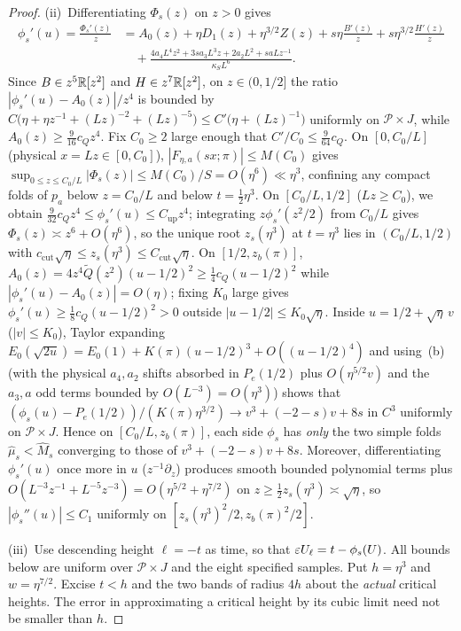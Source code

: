 \begin{proof}
(ii)~Differentiating $\Phi_s(z)$ on $z>0$ gives
\[
  \begin{aligned}
    \phi_s'(u) = \frac{\Phi_s'(z)}{z} &= A_0(z) + \eta D_1(z) + \eta^{3/2}Z(z) + s\eta\frac{B'(z)}{z} + s\eta^{3/2}\frac{H'(z)}{z}\\
    &\quad + \frac{4a_4 L^4 z^2 + 3sa_3 L^3 z + 2a_2 L^2 + saLz^{-1}}{\kappa_S L^6}.
  \end{aligned}
\]
Since $B\in z^5\mathbb{R}[z^2]$ and $H\in z^7\mathbb{R}[z^2]$, on $z\in(0,1/2]$ the ratio $|\phi_s'(u)-A_0(z)|/z^4$ is bounded by $C\big(\eta + \eta z^{-1} + (Lz)^{-2} + (Lz)^{-5}\big) \le C'\big(\eta + (Lz)^{-1}\big)$ uniformly on $\mathcal{P}\times J$, while $A_0(z)\ge\frac{9}{16}c_Q z^4$. Fix $C_0\ge 2$ large enough that $C'/C_0\le\frac{9}{64}c_Q$. On $[0,C_0/L]$ (physical $x=Lz\in[0,C_0]$), $|F_{\eta,a}(sx;\pi)|\le M(C_0)$ gives $\sup_{0\le z\le C_0/L}|\Phi_s(z)|\le M(C_0)/S=O(\eta^6)\ll\eta^3$, confining any compact folds of $p_a$ below $z=C_0/L$ and below $t=\frac12\eta^3$. On $[C_0/L,1/2]$ ($Lz\ge C_0$), we obtain $\frac{9}{32}c_Q z^4\le\phi_s'(u)\le C_{\mathrm{up}}z^4$; integrating $z\phi_s'(z^2/2)$ from $C_0/L$ gives $\Phi_s(z)\asymp z^6+O(\eta^6)$, so the unique root $z_s(\eta^3)$ at $t=\eta^3$ lies in $(C_0/L,1/2)$ with $c_{\mathrm{cut}}\sqrt\eta\le z_s(\eta^3)\le C_{\mathrm{cut}}\sqrt\eta$. On $[1/2,z_b(\pi)]$, $A_0(z)=4z^4\widetilde Q(z^2)(u-1/2)^2\ge\frac14 c_Q(u-1/2)^2$ while $|\phi_s'(u)-A_0(z)|=O(\eta)$; fixing $K_0$ large gives $\phi_s'(u)\ge\frac18 c_Q(u-1/2)^2>0$ outside $|u-1/2|\le K_0\sqrt\eta$. Inside $u=1/2+\sqrt\eta\,v$ ($|v|\le K_0$), Taylor expanding $E_0(\sqrt{2u})=E_0(1)+K(\pi)(u-1/2)^3+O((u-1/2)^4)$ and using~(b) (with the physical $a_4,a_2$ shifts absorbed in $P_e(1/2)$ plus $O(\eta^{5/2}v)$ and the $a_3,a$ odd terms bounded by $O(L^{-3})=O(\eta^3)$) shows that $(\phi_s(u)-P_e(1/2))/(K(\pi)\eta^{3/2})\to v^3+(-2-s)v+8s$ in $C^3$ uniformly on $\mathcal{P}\times J$. Hence on $[C_0/L,z_b(\pi)]$, each side $\phi_s$ has \emph{only} the two simple folds $\widehat\mu_s<\widehat M_s$ converging to those of $v^3+(-2-s)v+8s$. Moreover, differentiating $\phi_s'(u)$ once more in $u$ ($z^{-1}\partial_z$) produces smooth bounded polynomial terms plus $O(L^{-3}z^{-1}+L^{-5}z^{-3})=O(\eta^{5/2}+\eta^{7/2})$ on $z\ge\frac12 z_s(\eta^3)\asymp\sqrt\eta$, so $|\phi_s''(u)|\le C_1$ uniformly on $[z_s(\eta^3)^2/2,z_b(\pi)^2/2]$.

(iii)~Use descending height $\ell=-t$ as time, so that
$\varepsilon U_\ell=t-\phi_s(U)$. All bounds below are uniform over
$\mathcal P\times J$ and the eight specified samples. Put
$h=\eta^3$ and $w=\eta^{7/2}$. Excise $t<h$ and the two bands of
radius $4h$ about the \emph{actual} critical heights. The error in
approximating a critical height by its cubic limit need not be
smaller than $h$.


\end{proof}
